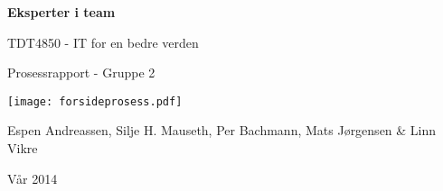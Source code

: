 \begin{titlepage}
\begin{center}
{\Huge {\bf Eksperter i team}}
\par
\vspace{0.1in}
{\LARGE TDT4850 - IT for en bedre verden}
\par
{\LARGE Prosessrapport - Gruppe 2}
\par
\vspace{0.5in}
\texttt{[image: forsideprosess.pdf]}

\par

\vfill{}
\vspace{0.5in}
Espen Andreassen, Silje H. Mauseth, Per Bachmann, Mats Jørgensen \& Linn Vikre
\par
Vår 2014
\end{center}
\end{titlepage}
